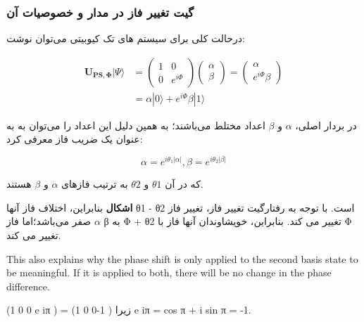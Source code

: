 \documentclass{book}
\begin{document}
\subsubsection{گیت تغییر فاز در مدار و خصوصیات آن}
درحالت کلی برای سیستم های تک کیوبیتی می‌توان نوشت:

\begin{center}
	$$\begin{aligned}
		\boldsymbol{U}_{\boldsymbol{P S}, \boldsymbol{\Phi}}|\Psi\rangle & =\left(\begin{array}{cc}
			1 & 0 \\
			0 & e^{i \Phi}
		\end{array}\right)\left(\begin{array}{l}
			\alpha \\
			\beta
		\end{array}\right)=\left(\begin{array}{c}
			\alpha \\
			e^{i \Phi} \beta
		\end{array}\right) \\
		& =\alpha|0\rangle+e^{i \Phi} \beta|1\rangle
	\end{aligned}$$
\end{center}
در بردار اصلی، $\alpha$ و $\beta$ اعداد مختلط می‌باشند؛ به همین دلیل این اعداد را می‌توان به به عنوان یک ضریب فاز معرفی کرد:

\begin{center}
\begin{equation}
\alpha = e^{i\theta_{1} \vert\alpha\vert }, \beta = e^{i\theta_{2} \vert\beta\vert}
\end{equation}
\end{center}
که در آن $\theta1$ و $\theta2$ به ترتیب فازهای $\alpha$ و $\beta$ هستند.

\textbf{اشکال}
بنابراین، اختلاف فاز آنها θ1 - θ2 است. با توجه به رفتارگیت تغییر فاز، تغییر فاز $\alpha$ صفر می‌باشد؛‌اما فاز β به Φ + θ2 تغییر می کند. بنابراین، خویشاوندان آنها فاز با Φ تغییر می کند. 

\begin{latin}
	\begin{center}
		This also explains why the phase shift is only applied to the
		second basis state to be meaningful. If it is applied to both, there will be no change
		in the phase difference.
	\end{center}
\end{latin}


 (1 0
0 e iπ
)
=
(1 0
0-1
)
زیرا e iπ = cos π + i sin π = -1.
\end{document}
